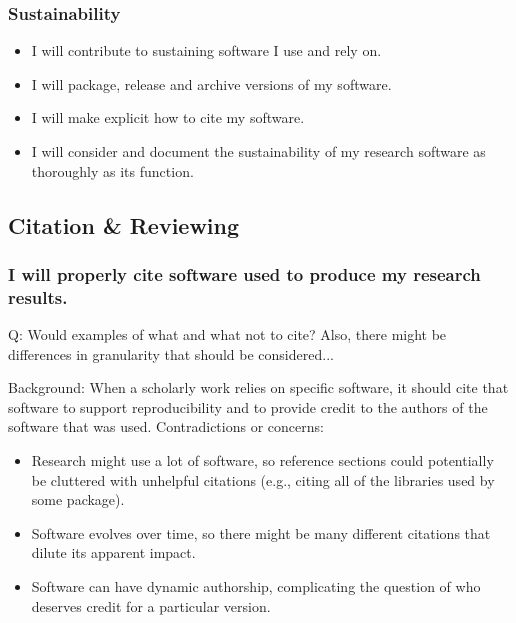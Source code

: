 \documentclass[a4paper,UKenglish]{dagman}
\renewcommand{\paragraph}[1]{\subsubsection*{#1}\xspace}
\begin{document}
\paragraph{Sustainability}
\begin{itemize}
\item I will contribute to sustaining software I use and rely on. 
\item I will package, release and archive versions of my software.
\item I will make explicit how to cite my software.
\item I will consider and document the sustainability of my research software as thoroughly as its function.
\end{itemize}


\subsection{Citation \& Reviewing}

\paragraph{I will properly cite software used to produce my research results.}

Q: Would examples of what and what not to cite? Also, there might be differences in granularity that should be considered...


Background: When a scholarly work relies on specific software, it should cite that software to support reproducibility and to provide credit to the authors of the software that was used.
Contradictions or concerns: 
\begin{itemize}
\item Research might use a lot of software, so reference sections could potentially be cluttered with unhelpful citations (e.g., citing all of the libraries used by some package). 
\item Software evolves over time, so there might be many different citations that dilute its apparent impact. 
\item Software can have dynamic authorship, complicating the question of who deserves credit for a particular version. 
\end{itemize}
\end{document}
